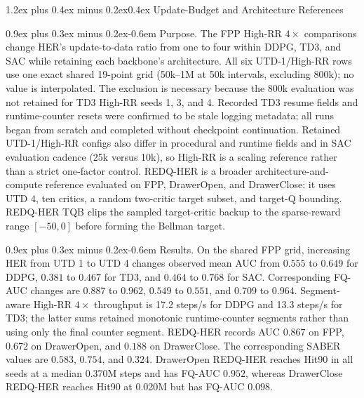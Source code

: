 \documentclass[10pt,letterpaper]{article}
\makeatletter
\renewcommand\subsection{\@startsection{subsection}{2}{0pt}%
  {1.2ex plus 0.4ex minus 0.2ex}{0.4ex}%
  {\normalfont\normalsize\bfseries}}
\renewcommand\paragraph{\@startsection{paragraph}{4}{0pt}%
  {0.9ex plus 0.3ex minus 0.2ex}{-0.6em}%
  {\normalfont\normalsize\bfseries}}
\newcommand{\sabertopshortstack}[2][c]{%
  \begin{tabular}[t]{@{}#1@{}}#2\end{tabular}}
\makeatother
\begin{document}
\FloatBarrier
\subsection{Update-Budget and Architecture References}

\paragraph{Purpose.}
The FPP High-RR \(4\times\) comparisons change HER's update-to-data ratio from
one to four within DDPG, TD3, and SAC while retaining each backbone's
architecture. All six UTD-1/High-RR rows use one exact shared 19-point grid
(50k--1M at 50k intervals, excluding 800k); no value is interpolated. The
exclusion is necessary because the 800k evaluation was not retained for TD3
High-RR seeds 1, 3, and 4. Recorded TD3 resume fields and runtime-counter
resets were confirmed to be stale logging metadata; all runs began from
scratch and completed without checkpoint continuation. Retained UTD-1/High-RR
configs also differ in procedural and runtime fields and in SAC evaluation
cadence (25k versus 10k), so High-RR is a scaling reference rather than a
strict one-factor control. REDQ-HER is a broader
architecture-and-compute reference
evaluated on FPP, DrawerOpen, and DrawerClose: it uses UTD 4, ten critics, a
random two-critic target subset, and target-Q bounding. REDQ-HER TQB clips the
sampled target-critic backup to the sparse-reward range \([-50,0]\) before
forming the Bellman target.

\begingroup
\let\shortstack\sabertopshortstack


\endgroup
\FloatBarrier

\paragraph{Results.}
On the shared FPP grid, increasing HER from UTD 1 to UTD 4 changes observed
mean AUC from \(0.555\) to \(0.649\) for DDPG, \(0.381\) to \(0.467\) for TD3,
and \(0.464\) to \(0.768\) for SAC. Corresponding FQ-AUC changes are
\(0.887\) to \(0.962\), \(0.549\) to \(0.551\), and \(0.709\) to \(0.964\).
Segment-aware High-RR \(4\times\) throughput is 17.2 steps/s for DDPG and
13.3 steps/s for TD3; the latter sums retained monotonic runtime-counter
segments rather than using only the final counter segment.
REDQ-HER records AUC
\(0.867\) on FPP, \(0.672\) on DrawerOpen, and \(0.188\) on DrawerClose. The
corresponding SABER values are \(0.583\), \(0.754\), and \(0.324\). DrawerOpen
REDQ-HER reaches Hit90 in all seeds at a median 0.370M steps and has FQ-AUC
\(0.952\), whereas DrawerClose REDQ-HER reaches Hit90 at 0.020M but has FQ-AUC
\(0.098\).
\end{document}

